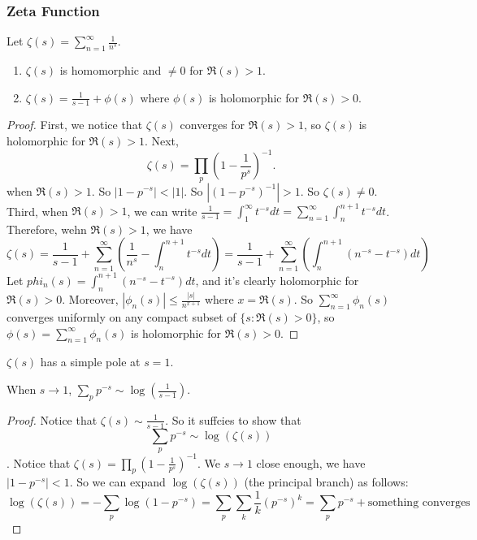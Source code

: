 \documentclass[15pt]{scrartcl}
\begin{document}
\subsubsection*{Zeta Function}
\begin{proposition}
    Let $\zeta(s)=\sum_{n=1}^\infty \frac{1}{n^s}$. 
    \begin{enumerate}
        \item $\zeta(s)$ is homomorphic and $\neq 0$ for $\Re(s)>1$.
        \item $\zeta(s)=\frac{1}{s-1}+\phi(s)$ where $\phi(s)$ is holomorphic for $\Re(s)>0$.
    \end{enumerate}
\end{proposition}
\begin{proof}
    First, we notice that $\zeta(s)$ converges for $\Re(s)>1$, so $\zeta(s)$ is holomorphic for $\Re(s)>1$. Next, 
    \[\zeta(s)=\prod_p\left(1-\frac{1}{p^s}\right)^{-1}.\]
    when $\Re(s)>1$. So $|1-p^{-s}|<|1|$. So $|(1-p^{-s})^{-1}|>1$. So $\zeta(s)\neq 0$. 
    \\

    Third, when $\Re(s)>1$, we can write $\frac{1}{s-1}=\int_{1}^\infty t^{-s}dt=\sum_{n=1}^\infty\int_{n}^{n+1}t^{-s}dt$.
    Therefore, wehn $\Re(s)>1$, we have 
    \[\zeta(s)=\frac{1}{s-1}+\sum_{n=1}^\infty\left(\frac{1}{n^s}-\int_{n}^{n+1}t^{-s}dt\right)=\frac{1}{s-1}+\sum_{n=1}^\infty\left(\int_{n}^{n+1}(n^{-s}-t^{-s})dt\right)\]
    Let $phi_n(s)=\int_{n}^{n+1}(n^{-s}-t^{-s})dt$, and it's clearly holomorphic for $\Re(s)>0$. Moreover, $|\phi_n(s)|\leq \frac{|s|}{n^{x+1}}$ where $x=\Re(s)$. So $\sum_{n=1}^\infty \phi_n(s)$ converges uniformly on any compact subset of $\{s: \Re(s)>0\}$, so $\phi(s)=\sum_{n=1}^\infty \phi_n(s)$ is holomorphic for $\Re(s)>0$.
\end{proof}
\begin{corollary}
    $\zeta(s)$ has a simple pole at $s=1$. 
\end{corollary}
\begin{corollary}
    When $s\to 1$, $\sum_p p^{-s}\sim \log(\frac{1}{s-1})$.
\end{corollary}
\begin{proof}
    Notice that $\zeta(s)\sim \frac{1}{s-1}$. So it suffcies to show that \[\sum_p p^{-s}\sim \log(\zeta(s))\]. 
    Notice that $\zeta(s)=\prod_p\left(1-\frac{1}{p^s}\right)^{-1}$. We $s\to 1$ close enough, we have $|1-p^{-s}|<1$. So we can expand $\log(\zeta(s))$ (the principal branch) as follows:
    \[\log(\zeta(s))=-\sum_p \log(1-p^{-s})=\sum_p \sum_k \frac{1}{k}(p^{-s})^k=\sum_p p^{-s}+ \text{something converges}\]

\end{proof}
\end{document}

